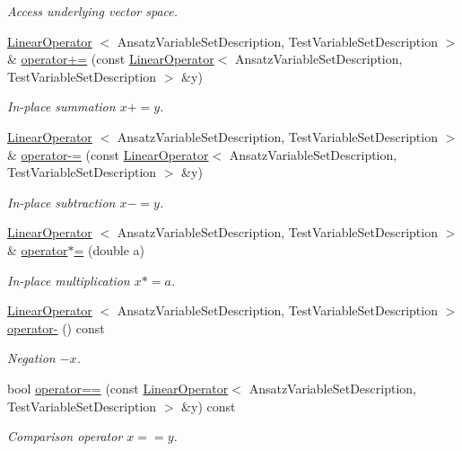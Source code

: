 \begin{DoxyCompactItemize}
\begin{DoxyCompactList}\small\item\em \-Access underlying vector space. \end{DoxyCompactList}\item 
\hyperlink{classSpacy_1_1Kaskade_1_1LinearOperator}{\-Linear\-Operator}\*
$<$ \-Ansatz\-Variable\-Set\-Description, \*
\-Test\-Variable\-Set\-Description $>$ \& \hyperlink{classSpacy_1_1AddArithmeticOperators_afad1d01e1e8c6f75290ac46d9b047ea8}{operator+=} (const \hyperlink{classSpacy_1_1Kaskade_1_1LinearOperator}{\-Linear\-Operator}$<$ \-Ansatz\-Variable\-Set\-Description, \-Test\-Variable\-Set\-Description $>$ \&y)
\begin{DoxyCompactList}\small\item\em \-In-\/place summation $ x+=y$. \end{DoxyCompactList}\item 
\hyperlink{classSpacy_1_1Kaskade_1_1LinearOperator}{\-Linear\-Operator}\*
$<$ \-Ansatz\-Variable\-Set\-Description, \*
\-Test\-Variable\-Set\-Description $>$ \& \hyperlink{classSpacy_1_1AddArithmeticOperators_a9fa91e177d13203cfe8cfa991c64ca36}{operator-\/=} (const \hyperlink{classSpacy_1_1Kaskade_1_1LinearOperator}{\-Linear\-Operator}$<$ \-Ansatz\-Variable\-Set\-Description, \-Test\-Variable\-Set\-Description $>$ \&y)
\begin{DoxyCompactList}\small\item\em \-In-\/place subtraction $ x-=y$. \end{DoxyCompactList}\item 
\hyperlink{classSpacy_1_1Kaskade_1_1LinearOperator}{\-Linear\-Operator}\*
$<$ \-Ansatz\-Variable\-Set\-Description, \*
\-Test\-Variable\-Set\-Description $>$ \& \hyperlink{classSpacy_1_1AddArithmeticOperators_a1d3db95b24fd2bc1de712c9e04c47e2f}{operator$\ast$=} (double a)
\begin{DoxyCompactList}\small\item\em \-In-\/place multiplication $ x*=a$. \end{DoxyCompactList}\item 
\hyperlink{classSpacy_1_1Kaskade_1_1LinearOperator}{\-Linear\-Operator}\*
$<$ \-Ansatz\-Variable\-Set\-Description, \*
\-Test\-Variable\-Set\-Description $>$ \hyperlink{classSpacy_1_1AddArithmeticOperators_a5acd030bf265d130983fd6e3c5b68be5}{operator-\/} () const
\begin{DoxyCompactList}\small\item\em \-Negation $ -x$. \end{DoxyCompactList}\item 
bool \hyperlink{classSpacy_1_1AddArithmeticOperators_a5ff1909f49f4a705d69663dc2d4b6316}{operator==} (const \hyperlink{classSpacy_1_1Kaskade_1_1LinearOperator}{\-Linear\-Operator}$<$ \-Ansatz\-Variable\-Set\-Description, \-Test\-Variable\-Set\-Description $>$ \&y) const
\begin{DoxyCompactList}\small\item\em \-Comparison operator $ x==y$. \end{DoxyCompactList}\end{DoxyCompactItemize}



